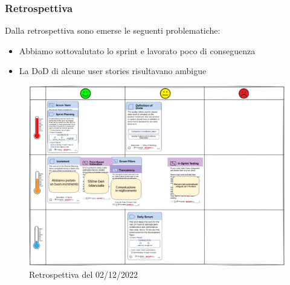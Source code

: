 \newpage
\subsubsection{Retrospettiva}
Dalla retrospettiva sono emerse le seguenti problematiche:
\begin{itemize}
    \item Abbiamo sottovalutato lo sprint e lavorato poco di conseguenza
    \item La DoD di alcune user stories risultavano ambigue
\end{itemize}
\begin{figure}[H]
    \centering
    \includegraphics[width=15cm]{./img/sprint3/retrospettiva.png}
    \caption{Retrospettiva del 02/12/2022}
\end{figure}
